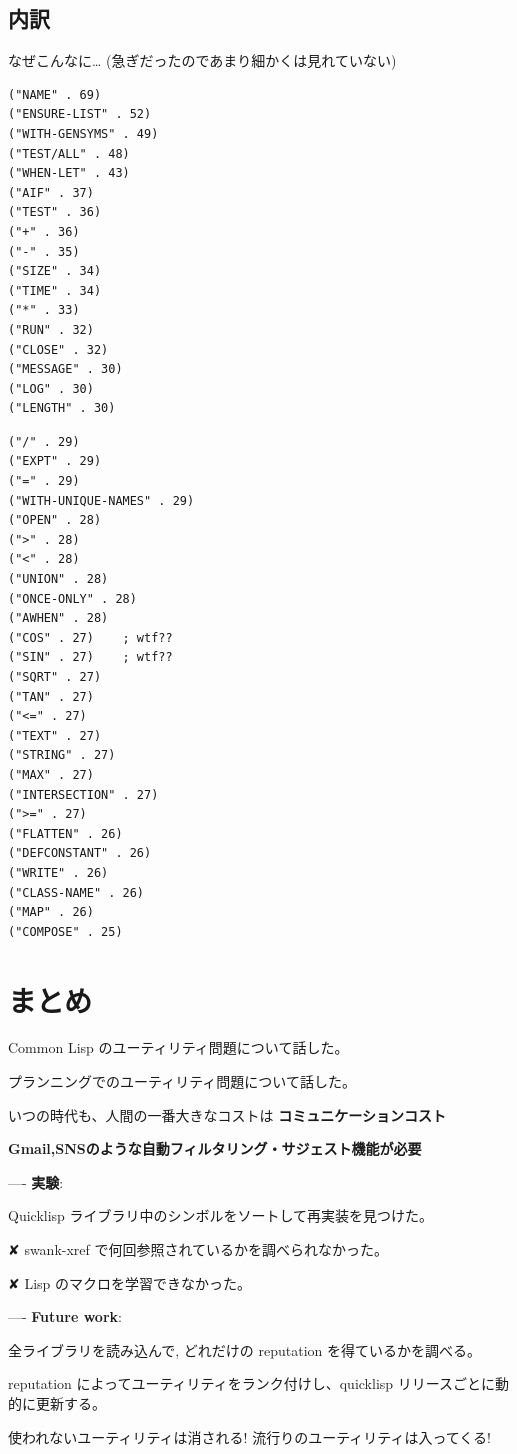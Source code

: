 \subsection{内訳}
\label{sec-9-2}

なぜこんなに\ldots{} (急ぎだったのであまり細かくは見れていない)

\begin{container-fluid}
\begin{row-fluid}
\begin{span6}
\begin{smaller}
\begin{verbatim}
("NAME" . 69)
("ENSURE-LIST" . 52)
("WITH-GENSYMS" . 49)
("TEST/ALL" . 48)
("WHEN-LET" . 43)
("AIF" . 37)
("TEST" . 36)
("+" . 36)
("-" . 35)
("SIZE" . 34)
("TIME" . 34)
("*" . 33)
("RUN" . 32)
("CLOSE" . 32)
("MESSAGE" . 30)
("LOG" . 30)
("LENGTH" . 30)
\end{verbatim}
\end{smaller}
\end{span6}

\begin{span6}
\begin{smaller}
\begin{verbatim}
("/" . 29)
("EXPT" . 29)
("=" . 29)
("WITH-UNIQUE-NAMES" . 29)
("OPEN" . 28)
(">" . 28)
("<" . 28)
("UNION" . 28)
("ONCE-ONLY" . 28)
("AWHEN" . 28)
("COS" . 27)    ; wtf??
("SIN" . 27)    ; wtf??
("SQRT" . 27)
("TAN" . 27)
("<=" . 27)
("TEXT" . 27)
("STRING" . 27)
("MAX" . 27)
("INTERSECTION" . 27)
(">=" . 27)
("FLATTEN" . 26)
("DEFCONSTANT" . 26)
("WRITE" . 26)
("CLASS-NAME" . 26)
("MAP" . 26)
("COMPOSE" . 25)
\end{verbatim}
\end{smaller}
\end{span6}
\end{row-fluid}
\end{container-fluid}

\section{まとめ}
\label{sec-10}

Common Lisp のユーティリティ問題について話した。

プランニングでのユーティリティ問題について話した。

いつの時代も、人間の一番大きなコストは \textbf{コミュニケーションコスト}

\textbf{Gmail,SNSのような自動フィルタリング・サジェスト機能が必要}

---- \textbf{実験}:

Quicklisp ライブラリ中のシンボルをソートして再実装を見つけた。

✘ swank-xref で何回参照されているかを調べられなかった。

✘ Lisp のマクロを学習できなかった。

---- \textbf{Future work}:

全ライブラリを読み込んで, どれだけの reputation を得ているかを調べる。

reputation によってユーティリティをランク付けし、quicklisp リリースごとに動的に更新する。

使われないユーティリティは消される! 流行りのユーティリティは入ってくる!
